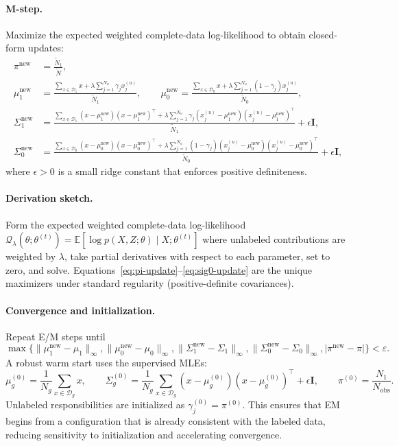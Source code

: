 \documentclass[11pt]{article}
\theoremstyle{definition}
\newcommand{\E}{\mathbb{E}}
\newcommand{\bI}{\mathbf{I}}
\newcommand{\calD}{\mathcal{D}}
\newcommand{\lam}{\lambda}
\newcommand{\Sig}{\Sigma}
\newcommand{\calQ}{\mathcal{Q}}
\begin{document}
\paragraph{M-step.}
Maximize the expected weighted complete-data log-likelihood to obtain
closed-form updates:
\begin{align}
\pi^{\text{new}} &= \frac{\widetilde{N}_1}{\widetilde{N}}, \label{eq:pi-update}\\[4pt]
\mu_1^{\text{new}} &= \frac{{\displaystyle\sum_{x\in \calD_1}} x
  + \lam \sum_{j=1}^{N_u} \gamma_j x_j^{(u)}}{\widetilde{N}_1},
\qquad
\mu_0^{\text{new}} = \frac{{\displaystyle\sum_{x\in \calD_0}} x
  + \lam \sum_{j=1}^{N_u} (1-\gamma_j) x_j^{(u)}}{\widetilde{N}_0},
\label{eq:mu-update}\\[4pt]
\Sig_1^{\text{new}} &=
\frac{
{\displaystyle\sum_{x\in \calD_1}} (x-\mu_1^{\text{new}})(x-\mu_1^{\text{new}})^\top
+ \lam \sum_{j=1}^{N_u} \gamma_j (x_j^{(u)}-\mu_1^{\text{new}})(x_j^{(u)}-\mu_1^{\text{new}})^\top
}{\widetilde{N}_1} + \epsilon\bI, \label{eq:sig1-update}\\[4pt]
\Sig_0^{\text{new}} &=
\frac{
{\displaystyle\sum_{x\in \calD_0}} (x-\mu_0^{\text{new}})(x-\mu_0^{\text{new}})^\top
+ \lam \sum_{j=1}^{N_u} (1-\gamma_j) (x_j^{(u)}-\mu_0^{\text{new}})(x_j^{(u)}-\mu_0^{\text{new}})^\top
}{\widetilde{N}_0} + \epsilon\bI,
\label{eq:sig0-update}
\end{align}
where \(\epsilon>0\) is a small ridge constant that enforces positive definiteness.

\paragraph{Derivation sketch.}
Form the expected weighted complete-data log-likelihood
\(\calQ_\lam(\theta;\theta^{(t)}) = \E[\log p(X,Z;\theta)\mid X;\theta^{(t)}]\)
where unlabeled contributions are weighted by \(\lam\), take partial derivatives
with respect to each parameter, set to zero, and solve.
Equations~\eqref{eq:pi-update}--\eqref{eq:sig0-update} are the unique
maximizers under standard regularity (positive-definite covariances).

\paragraph{Convergence and initialization.}
Repeat E/M steps until
\[
\max\!\Big\{\|\mu_1^{\text{new}}-\mu_1\|_\infty, \|\mu_0^{\text{new}}-\mu_0\|_\infty,
\|\Sig_1^{\text{new}}-\Sig_1\|_\infty, \|\Sig_0^{\text{new}}-\Sig_0\|_\infty,
|\pi^{\text{new}}-\pi|\Big\}<\varepsilon.
\]
A robust warm start uses the supervised MLEs:
\[
\mu_g^{(0)}=\frac{1}{N_g}\sum_{x\in\calD_g}x,\qquad
\Sig_g^{(0)}=\frac{1}{N_g}\sum_{x\in\calD_g}(x-\mu_g^{(0)})(x-\mu_g^{(0)})^\top + \epsilon\bI,
\qquad
\pi^{(0)}=\frac{N_1}{N_{\mathrm{obs}}}.
\]
Unlabeled responsibilities are initialized as \(\gamma_j^{(0)}=\pi^{(0)}\).
This ensures that EM begins from a configuration that is already consistent
with the labeled data, reducing sensitivity to initialization and accelerating
convergence.
\end{document}
